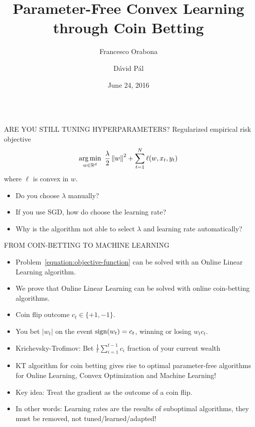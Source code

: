 \documentclass[final,t,serif,mathserif]{beamer}
\title{\huge Parameter-Free Convex Learning through Coin Betting}
\author{Francesco Orabona \and D\'avid P\'al}
\institute[] %
{
  Yahoo Research, New York
}
\date[June 24, 2016]{June 24, 2016}
\def\spazio{\vspace{-0.325cm}}
\begin{document}
\begin{frame}{}

\begin{columns}[t]
  \begin{column}{.33\linewidth}

    \begin{block}{ARE YOU STILL TUNING HYPERPARAMETERS?}
      \spazio
      Regularized empirical risk objective
      \begin{equation}
      \label{equation:objective-function}
         \operatorname*{arg\,min}_{w \in \mathbb{R}^d} \ \frac{\lambda}{2} \left\|{w}\right\|^2 + \sum_{t=1}^N \ell(w, x_t, y_t)
      \end{equation}
      where $\ell$ is convex in $w$.
      \begin{itemize}
      \item Do you choose $\lambda$ manually?
      \item If you use SGD, how do choose the learning rate?
      \item Why is the algorithm not able to select $\lambda$ and learning rate automatically?
      \end{itemize}
      \spazio
    \end{block}


    \begin{block}{FROM COIN-BETTING TO MACHINE LEARNING}
    \spazio
    \begin{itemize}
      \item Problem~\eqref{equation:objective-function} can be solved with an Online Linear Learning algorithm.
      \item We prove that Online Linear Learning can be solved with online coin-betting algorithms.
    \end{itemize}

    \vspace{1cm}

    \begin{itemize}
      \item Coin flip outcome $c_t \in \{+1, -1\}$.
      \item You bet $|w_t|$ on the event ${\rm sign}(w_t) = c_t$, winning or losing $w_t c_t$.
      \item Krichevsky-Trofimov: Bet $\tfrac{1}{t} \sum_{i=1}^{t-1} c_i$ fraction of your current wealth
      \item \alert{KT algorithm for coin betting gives rise to optimal parameter-free algorithms for Online Learning, Convex Optimization and Machine Learning!}
      \item Key idea: Treat the gradient as the outcome of a coin flip.
      \item In other words: \alert{Learning rates are the results of suboptimal algorithms, they must be removed, not tuned/learned/adapted!}
    \end{itemize}
    \spazio
    \end{block}


\end{column}
\end{columns}
\end{frame}
\end{document}
